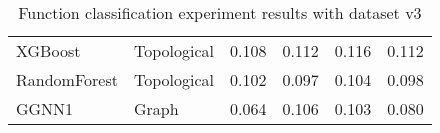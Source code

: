 \begin{table}[H]
{{\begin{tabular}{|llrrrr|}
  

  XGBoost &           Topological &     0.108 &                    0.112 &                 0.116 &     0.112 \\
  
  RandomForest &           Topological &     0.102 &                    0.097 &                 0.104 &     0.098 \\
  GGNN1 &                  Graph &     0.064 &                    0.106 &                 0.103 &     0.080 \\
  
  
                 
\hline
\end{tabular}
}
}\label{FN_exp_v3}\caption{Function classification experiment results with dataset v3}
\end{table}
